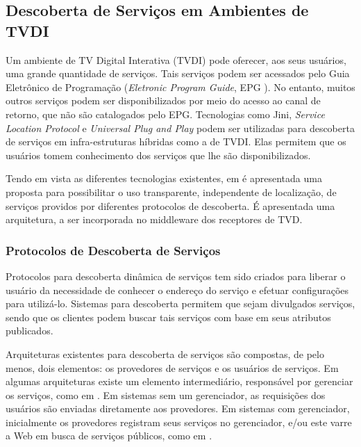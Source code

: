 \subsection{Descoberta de Serviços em Ambientes de TVDI \cite{borges2007arquitetura}} 

Um ambiente de TV Digital Interativa (TVDI) pode oferecer, aos seus usuários, uma grande quantidade de serviços. Tais serviços podem ser acessados pelo Guia Eletrônico de Programação (\textit{Eletronic Program Guide}, EPG ). No entanto, muitos outros serviços podem ser disponibilizados por meio do acesso ao canal de retorno, que não são catalogados pelo EPG. Tecnologias como Jini, \textit{Service Location Protocol} e \textit{Universal Plug and Play} podem ser utilizadas para descoberta de serviços em infra-estruturas híbridas como a de TVDI. Elas permitem que os usuários tomem conhecimento dos serviços que lhe são disponibilizados.

Tendo em vista as diferentes tecnologias existentes, em \cite{borges2007arquitetura} é apresentada uma proposta para possibilitar o uso transparente, independente de localização, de serviços providos por diferentes protocolos de descoberta. É apresentada uma arquitetura, a ser incorporada no middleware dos receptores de TVD.

\subsubsection{Protocolos de Descoberta de Serviços} \label{service-discovery-protocols}

Protocolos para descoberta dinâmica de serviços tem sido criados para liberar o usuário da necessidade de conhecer o endereço do serviço e efetuar configurações para utilizá-lo. Sistemas para descoberta permitem que sejam divulgados serviços, sendo que os clientes podem buscar tais serviços com base em seus atributos publicados.

Arquiteturas existentes para descoberta de serviços são compostas, de pelo menos, dois elementos: os provedores de serviços e os usuários de serviços. Em algumas arquiteturas existe um elemento intermediário, responsável por gerenciar os serviços, como em \cite{al2008toward}. Em sistemas sem um gerenciador, as requisições dos usuários são enviadas diretamente aos provedores. Em sistemas com gerenciador, inicialmente os provedores registram seus serviços no gerenciador, e/ou este varre a Web em busca de serviços públicos, como em \cite{al2008toward}.

